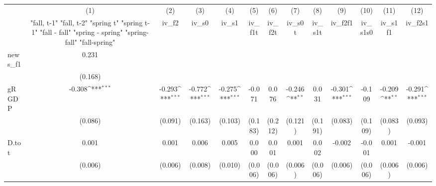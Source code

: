 {
\def\sym#1{\ifmmode^{#1}\else\(^{#1}\)\fi}
\begin{tabular}{l*{12}{c}}
\toprule
            &\multicolumn{1}{c}{(1)}&\multicolumn{1}{c}{(2)}&\multicolumn{1}{c}{(3)}&\multicolumn{1}{c}{(4)}&\multicolumn{1}{c}{(5)}&\multicolumn{1}{c}{(6)}&\multicolumn{1}{c}{(7)}&\multicolumn{1}{c}{(8)}&\multicolumn{1}{c}{(9)}&\multicolumn{1}{c}{(10)}&\multicolumn{1}{c}{(11)}&\multicolumn{1}{c}{(12)}\\
            &\multicolumn{1}{c}{  "fall, t-1" "fall, t-2" "spring t" "spring t-1"  "fall - fall" "spring - spring" "spring-fall" "fall-spring" }&\multicolumn{1}{c}{iv\_f2}&\multicolumn{1}{c}{iv\_s0}&\multicolumn{1}{c}{iv\_s1}&\multicolumn{1}{c}{iv\_f1t}&\multicolumn{1}{c}{iv\_f2t}&\multicolumn{1}{c}{iv\_s0t}&\multicolumn{1}{c}{iv\_s1t}&\multicolumn{1}{c}{iv\_f2f1}&\multicolumn{1}{c}{iv\_s1s0}&\multicolumn{1}{c}{iv\_s1f1}&\multicolumn{1}{c}{iv\_f2s1}\\
\midrule
news\_f1     &       0.231         &                     &                     &                     &                     &                     &                     &                     &                     &                     &                     &                     \\
            &     (0.168)         &                     &                     &                     &                     &                     &                     &                     &                     &                     &                     &                     \\
\addlinespace
gRGDP       &      -0.308\sym{***}&      -0.293\sym{***}&      -0.772\sym{***}&      -0.275\sym{***}&      -0.071         &       0.076         &      -0.246\sym{**} &       0.031         &      -0.301\sym{***}&      -0.109         &      -0.209\sym{**} &      -0.291\sym{***}\\
            &     (0.086)         &     (0.091)         &     (0.163)         &     (0.103)         &     (0.183)         &     (0.212)         &     (0.121)         &     (0.191)         &     (0.083)         &     (0.109)         &     (0.083)         &     (0.093)         \\
\addlinespace
D.tot       &       0.001         &       0.001         &       0.006         &       0.005         &       0.000         &       0.001         &       0.001         &       0.002         &      -0.002         &      -0.001         &       0.001         &      -0.001         \\
            &     (0.006)         &     (0.006)         &     (0.008)         &     (0.010)         &     (0.006)         &     (0.006)         &     (0.006)         &     (0.006)         &     (0.006)         &     (0.006)         &     (0.006)         &     (0.006)         \\

\end{tabular}}
